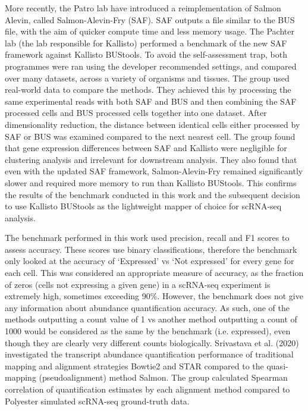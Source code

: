 More recently, the Patro lab have introduced a reimplementation of Salmon Alevin, called Salmon-Alevin-Fry (SAF)\cite{sarkar2020accurate}.
SAF outputs a file similar to the BUS file, with the aim of quicker compute time and less memory usage.
The Pachter lab (the lab responsible for Kallisto) performed a benchmark of the new SAF framework against Kallisto BUStools\cite{booeshaghi2021benchmarking}.
To avoid the self-assessment trap, both programmes were ran using the developer recommended settings, and compared over many datasets, across a variety of organisms and tissues.
The group used real-world data to compare the methods.
They achieved this by processing the same experimental reads with both SAF and BUS and then combining the SAF processed cells and BUS processed cells together into one dataset.
After dimensionality reduction, the distance between identical cells either processed by SAF or BUS was examined compared to the next nearest cell.
The group found that gene expression differences between SAF and Kallisto were negligible for clustering analysis and irrelevant for downstream analysis.
They also found that even with the updated SAF framework, Salmon-Alevin-Fry remained significantly slower and required more memory to run than Kallisto BUStools.
This confirms the results of the benchmark conducted in this work and the subsequent decision to use Kallisto BUStools as the lightweight mapper of choice for scRNA-seq analysis.

The benchmark performed in this work used precision, recall and F1 scores to assess accuracy.
These scores use binary classifications, therefore the benchmark only looked at the accuracy of `Expressed' vs `Not expressed' for every gene for each cell.
This was considered an appropriate measure of accuracy, as the fraction of zeros (cells not expressing a given gene) in a scRNA-seq experiment is extremely high, sometimes exceeding 90\%\cite{linderman2022zero}.
However, the benchmark does not give any information about abundance quantification accuracy.
As such, one of the methods outputting a count value of 1 vs another method outputting a count of 1000 would be considered as the same by the benchmark (i.e. expressed), even though they are clearly very different counts biologically.
Srivastava et al. (2020) investigated the transcript abundance quantification performance of traditional mapping and alignment strategies Bowtie2 and STAR compared to the quasi-mapping (pseudoalignment) method Salmon\cite{srivastava2020alignment}.
The group calculated Spearman correlation of quantification estimates by each alignment method compared to Polyester simulated scRNA-seq ground-truth data.

